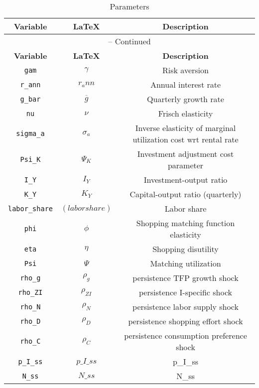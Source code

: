 \begin{center}
\begin{longtable}{ccc}
\caption{Parameters}\\%
\hline%
\multicolumn{1}{c}{\textbf{Variable}} &
\multicolumn{1}{c}{\textbf{\LaTeX}} &
\multicolumn{1}{c}{\textbf{Description}}\\%
\hline\hline%
\endfirsthead
\multicolumn{3}{c}{{\tablename} \thetable{} -- Continued}\\%
\hline%
\multicolumn{1}{c}{\textbf{Variable}} &
\multicolumn{1}{c}{\textbf{\LaTeX}} &
\multicolumn{1}{c}{\textbf{Description}}\\%
\hline\hline%
\endhead
\texttt{gam} & ${\gamma}$ & Risk aversion\\
\texttt{r\_ann} & ${r_ann}$ & Annual interest rate\\
\texttt{g\_bar} & ${\overline{g}}$ & Quarterly growth rate\\
\texttt{nu} & $\nu$ & Frisch elasticity\\
\texttt{sigma\_a} & ${\sigma_a}$ & Inverse elasticity of marginal utilization cost wrt rental rate\\
\texttt{Psi\_K} & ${\Psi_K}$ & Investment adjustment cost parameter\\
\texttt{I\_Y} & ${I_Y}$ & Investment-output ratio\\
\texttt{K\_Y} & ${K_Y}$ & Capital-output ratio (quarterly)\\
\texttt{labor\_share} & $(labor share)$ & Labor share\\
\texttt{phi} & ${\phi}$ & Shopping matching function elasticity\\
\texttt{eta} & ${\eta}$ & Shopping disutility\\
\texttt{Psi} & ${\Psi}$ & Matching utilization\\
\texttt{rho\_g} & ${\rho_g}$ & persistence TFP growth shock\\
\texttt{rho\_ZI} & ${\rho_{ZI}}$ & persistence I-specific shock\\
\texttt{rho\_N} & ${\rho_N}$ & persistence labor supply shock\\
\texttt{rho\_D} & ${\rho_D}$ & persistence shopping effort shock\\
\texttt{rho\_C} & ${\rho_C}$ & persistence consumption preference shock\\
\texttt{p\_I\_ss} & $p\_I\_ss$ & p\_I\_ss\\
\texttt{N\_ss} & $N\_ss$ & N\_ss\\
\hline%
\end{longtable}
\end{center}
